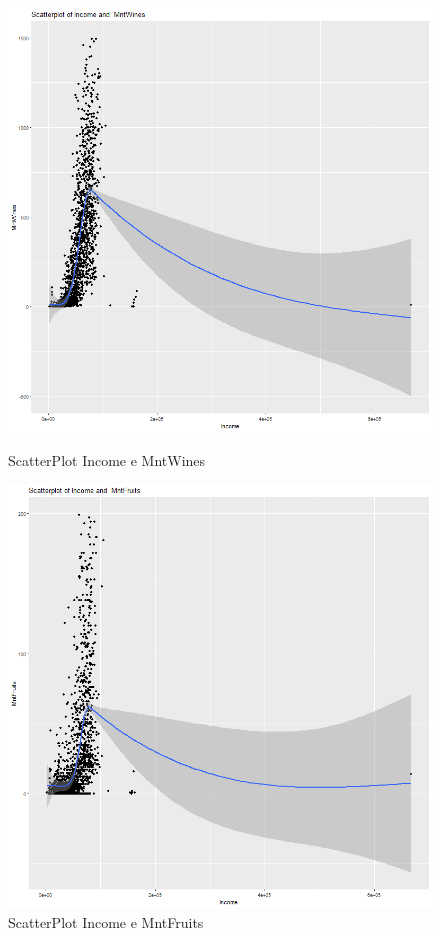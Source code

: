 \documentclass[letterpaper,11pt]{article}
\begin{document}
\begin{figure}[H]
  \centering
  \begin{minipage}[b]{0.4\textwidth}
    \includegraphics[width=\textwidth]{Img/EDA/EDA035.png}
    \caption{ScatterPlot Income e MntWines}
     \label{fig:ScatterPlotIncomeMntWines}
  \end{minipage}
  \hfill
  \begin{minipage}[b]{0.4\textwidth}
    \includegraphics[width=\textwidth]{Img/EDA/EDA036.png}
    \caption{ScatterPlot Income e MntFruits}
     \label{fig:ScatterPlotIncomeMntFruits}
  \end{minipage}
\end{figure}
\end{document}
